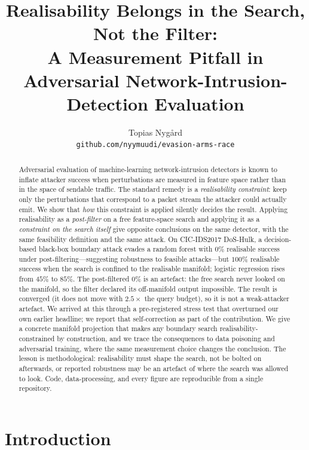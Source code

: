 \documentclass[10pt,twocolumn]{article}
\title{\textbf{Realisability Belongs in the Search, Not the Filter:\\
A Measurement Pitfall in Adversarial Network-Intrusion-Detection Evaluation}}
\author{Topias Nyg\aa{}rd\\
\small \texttt{github.com/nyymuudi/evasion-arms-race}}
\date{}
\begin{document}
\maketitle

\begin{abstract}
Adversarial evaluation of machine-learning network-intrusion detectors is known
to inflate attacker success when perturbations are measured in feature space
rather than in the space of sendable traffic. The standard remedy is a
\emph{realisability constraint}: keep only the perturbations that correspond to a
packet stream the attacker could actually emit. We show that \emph{how} this
constraint is applied silently decides the result. Applying realisability as a
\emph{post-filter} on a free feature-space search and applying it as a
\emph{constraint on the search itself} give opposite conclusions on the same
detector, with the same feasibility definition and the same attack. On
CIC-IDS2017 DoS-Hulk, a decision-based black-box boundary attack evades a random
forest with $0\%$ realisable success under post-filtering---suggesting robustness
to feasible attacks---but $100\%$ realisable success when the search is confined
to the realisable manifold; logistic regression rises from $45\%$ to $85\%$. The
post-filtered $0\%$ is an artefact: the free search never looked on the manifold,
so the filter declared its off-manifold output impossible. The result is
converged (it does not move with $2.5\times$ the query budget), so it is not a
weak-attacker artefact. We arrived at this through a pre-registered stress test
that overturned our own earlier headline; we report that self-correction as part
of the contribution. We give a concrete manifold projection that makes any
boundary search realisability-constrained by construction, and we trace the
consequences to data poisoning and adversarial training, where the same
measurement choice changes the conclusion. The lesson is methodological:
realisability must shape the search, not be bolted on afterwards, or reported
robustness may be an artefact of where the search was allowed to look. Code,
data-processing, and every figure are reproducible from a single repository.
\end{abstract}

\section{Introduction}
\end{document}
